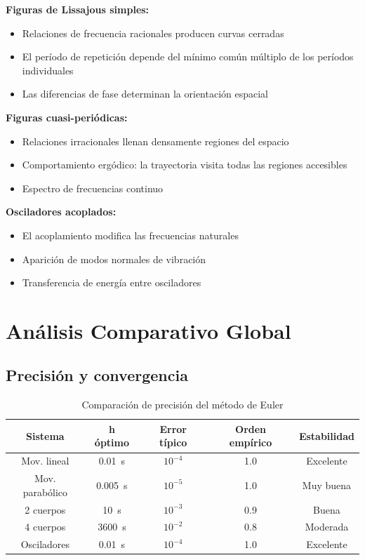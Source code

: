 \documentclass{article}
\begin{document}
	\textbf{Figuras de Lissajous simples:}
	\begin{itemize}
	\item Relaciones de frecuencia racionales producen curvas cerradas
	\item El período de repetición depende del mínimo común múltiplo de los períodos individuales
	\item Las diferencias de fase determinan la orientación espacial
	\end{itemize}
	
	\textbf{Figuras cuasi-periódicas:}
	\begin{itemize}
	\item Relaciones irracionales llenan densamente regiones del espacio
	\item Comportamiento ergódico: la trayectoria visita todas las regiones accesibles
	\item Espectro de frecuencias continuo
	\end{itemize}
	
	\textbf{Osciladores acoplados:}
	\begin{itemize}
	\item El acoplamiento modifica las frecuencias naturales
	\item Aparición de modos normales de vibración
	\item Transferencia de energía entre osciladores
	\end{itemize}

	\section{Análisis Comparativo Global}
	
	\subsection{Precisión y convergencia}
	
	\begin{table}[H]
		\centering
		\caption{Comparación de precisión del método de Euler}
		\begin{tabular}{|c|c|c|c|c|}
			\hline
			\textbf{Sistema} & \textbf{h óptimo} & \textbf{Error típico} & \textbf{Orden empírico} & \textbf{Estabilidad} \\
			\hline
			Mov. lineal & 0.01~s & $10^{-4}$ & 1.0 & Excelente \\
			Mov. parabólico & 0.005~s & $10^{-5}$ & 1.0 & Muy buena \\
			2 cuerpos & 10~s & $10^{-3}$ & 0.9 & Buena \\
			4 cuerpos & 3600~s & $10^{-2}$ & 0.8 & Moderada \\
			Osciladores & 0.01~s & $10^{-4}$ & 1.0 & Excelente \\
			\hline
		\end{tabular}
	\end{table}
	
\end{document}
